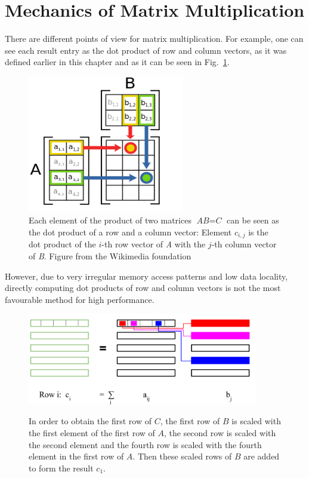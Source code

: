 \section{Mechanics of Matrix Multiplication}

There are different points of view for matrix multiplication. For example, one can see each result entry as the dot product of row and column vectors, as it was defined earlier in this chapter and as it can be seen in Fig.~\ref{fig:matmult_dot_product}.
\begin{figure}[tb]
\centering
 \includegraphics[height=6cm]{matrix_multiplication_wiki}
\caption{Each element of the product of two matrices $\textit{AB} = \textit{C}$ can be seen as the dot product of a row and a column vector: Element $c_{i,j}$ is the dot product of the $i$-th row vector of \textit{A} with the $j$-th column vector of \textit{B}. Figure from the Wikimedia foundation	 \cite{wiki:matrix_multiplication_image}}
\label{fig:matmult_dot_product}
\end{figure}
However, due to very irregular memory access patterns and low data locality, directly computing dot products of row and column vectors is not the most favourable method for high performance. 



\begin{figure}[tb]
\centering
{\includegraphics[width=0.9\textwidth]{matrix_multiplication}}
\caption{In order to obtain the first row of $C$, the first row of $B$ is scaled with the first element of the first row of $A$, the second row is scaled with the second element and the fourth row is scaled with the fourth element in the first row of $A$. Then these scaled rows of $B$ are added to form the result $c_1$.}
\label{fig:matmult_petsc}
\end{figure}


